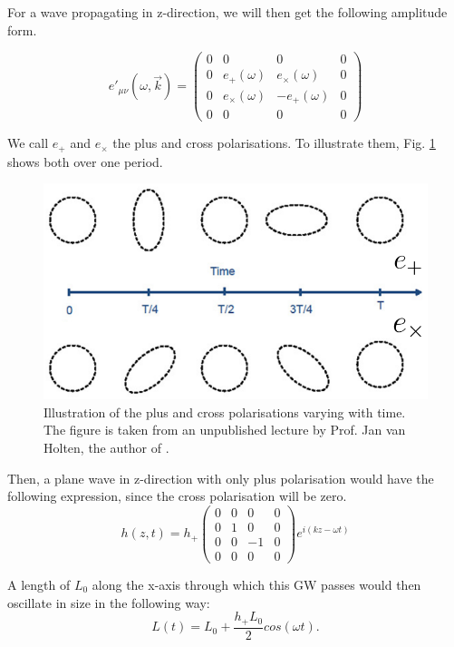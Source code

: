 For a wave propagating in z-direction, we will then get the following amplitude form.

\begin{equation}
    e'_{\mu\nu}(\omega, \vec{k})=
    \begin{pmatrix}
        0 & 0 & 0 & 0 \\
        0 & e_+(\omega) & e_\times(\omega) & 0 \\ 
        0 & e_\times(\omega) & -e_+(\omega) & 0 \\
        0 & 0 & 0 & 0
    \end{pmatrix}
\end{equation}

We call $e_+$ and $e_\times$ the plus and cross polarisations. To illustrate them, Fig. \ref{polarisation} shows both over one period.

\begin{figure}[h]
    \centering
    \includegraphics[width=0.35\linewidth]{Images/polarisations.png}
    \caption[Illustration of the plus and cross polarisations varying with time.]{Illustration of the plus and cross polarisations varying with time. The figure is taken from an unpublished lecture by Prof. Jan van Holten, the author of \cite{van_holten_gravitational_2019}.}
    \label{polarisation}
\end{figure} 


Then, a plane wave in z-direction with only plus polarisation would have the following expression, since the cross polarisation will be zero.
\begin{equation}
    h(z, t) = h_+ 
    \begin{pmatrix}
        0 & 0 & 0 & 0 \\
        0 &1 & 0 & 0 \\
        0 & 0 & -1 & 0 \\
        0 &  0 & 0 & 0
    \end{pmatrix}
    e^{i(k z-\omega t)}
\end{equation}

A length of $L_0$ along the x-axis through which this GW passes would then oscillate in size in the
following way:
\begin{equation}
    L(t) = L_0 + \frac{h_+ L_0}{2} cos(\omega t).
\end{equation}

